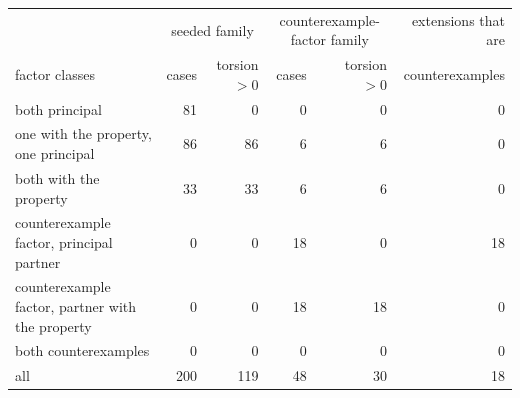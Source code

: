\begin{tabular}{lrrrrr}
\toprule
 & \multicolumn{2}{c}{seeded family} & \multicolumn{2}{c}{counterexample-factor family} & extensions that are\\
factor classes & cases & torsion $>0$ & cases & torsion $>0$ & counterexamples\\
\midrule
both principal & 81 & 0 & 0 & 0 & 0 \\
one with the property, one principal & 86 & 86 & 6 & 6 & 0 \\
both with the property & 33 & 33 & 6 & 6 & 0 \\
counterexample factor, principal partner & 0 & 0 & 18 & 0 & 18 \\
counterexample factor, partner with the property & 0 & 0 & 18 & 18 & 0 \\
both counterexamples & 0 & 0 & 0 & 0 & 0 \\
all & 200 & 119 & 48 & 30 & 18 \\
\bottomrule
\end{tabular}
